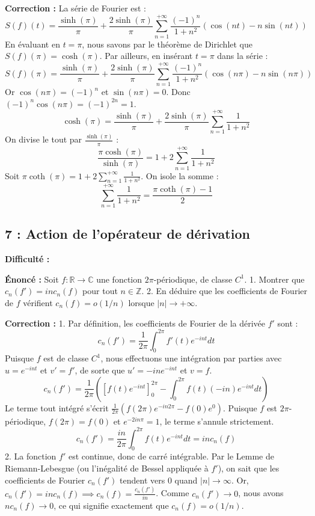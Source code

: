 \documentclass[12pt,a4paper]{article}
\begin{document}
\textbf{Correction :}
La série de Fourier est :
$$S(f)(t) = \frac{\sinh(\pi)}{\pi} + \frac{2\sinh(\pi)}{\pi} \sum_{n=1}^{+\infty} \frac{(-1)^n}{1+n^2} (\cos(nt) - n \sin(nt))$$
En évaluant en $t=\pi$, nous savons par le théorème de Dirichlet que $S(f)(\pi) = \cosh(\pi)$.
Par ailleurs, en insérant $t=\pi$ dans la série :
$$S(f)(\pi) = \frac{\sinh(\pi)}{\pi} + \frac{2\sinh(\pi)}{\pi} \sum_{n=1}^{+\infty} \frac{(-1)^n}{1+n^2} (\cos(n\pi) - n \sin(n\pi))$$
Or $\cos(n\pi) = (-1)^n$ et $\sin(n\pi) = 0$. Donc $(-1)^n \cos(n\pi) = (-1)^{2n} = 1$.
$$\cosh(\pi) = \frac{\sinh(\pi)}{\pi} + \frac{2\sinh(\pi)}{\pi} \sum_{n=1}^{+\infty} \frac{1}{1+n^2}$$
On divise le tout par $\frac{\sinh(\pi)}{\pi}$ :
$$\frac{\pi \cosh(\pi)}{\sinh(\pi)} = 1 + 2 \sum_{n=1}^{+\infty} \frac{1}{1+n^2}$$
Soit $\pi \coth(\pi) = 1 + 2 \sum_{n=1}^{+\infty} \frac{1}{1+n^2}$.
On isole la somme :
$$\sum_{n=1}^{+\infty} \frac{1}{1+n^2} = \frac{\pi \coth(\pi) - 1}{2}$$


\subsection*{7 : Action de l'opérateur de dérivation}

\textbf{Difficulté :} \bigstar\bigstar\bigstar\bigstar\star

\textbf{Énoncé :}
Soit $f : \mathbb{R} \to \mathbb{C}$ une fonction $2\pi$-périodique, de classe $C^1$.
1. Montrer que $c_n(f') = in c_n(f)$ pour tout $n \in \mathbb{Z}$.
2. En déduire que les coefficients de Fourier de $f$ vérifient $c_n(f) = o(1/n)$ lorsque $|n| \to +\infty$.

\textbf{Correction :}
1. Par définition, les coefficients de Fourier de la dérivée $f'$ sont :
   $$c_n(f') = \frac{1}{2\pi} \int_0^{2\pi} f'(t) e^{-int} dt$$
   Puisque $f$ est de classe $C^1$, nous effectuons une intégration par parties avec $u = e^{-int}$ et $v' = f'$, de sorte que $u' = -in e^{-int}$ et $v = f$.
   $$c_n(f') = \frac{1}{2\pi} \left( \left[ f(t) e^{-int} \right]_0^{2\pi} - \int_0^{2\pi} f(t) (-in) e^{-int} dt \right)$$
   Le terme tout intégré s'écrit $\frac{1}{2\pi} (f(2\pi) e^{-in 2\pi} - f(0) e^0)$. Puisque $f$ est $2\pi$-périodique, $f(2\pi) = f(0)$ et $e^{-2in\pi} = 1$, le terme s'annule strictement.
   $$c_n(f') = \frac{in}{2\pi} \int_0^{2\pi} f(t) e^{-int} dt = in c_n(f)$$
2. La fonction $f'$ est continue, donc de carré intégrable. Par le Lemme de Riemann-Lebesgue (ou l'inégalité de Bessel appliquée à $f'$), on sait que les coefficients de Fourier $c_n(f')$ tendent vers $0$ quand $|n| \to \infty$.
   Or, $c_n(f') = in c_n(f) \implies c_n(f) = \frac{c_n(f')}{in}$.
   Comme $c_n(f') \to 0$, nous avons $n c_n(f) \to 0$, ce qui signifie exactement que $c_n(f) = o(1/n)$.
\end{document}
